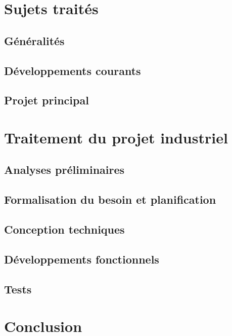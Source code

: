 \documentclass[a4paper, 12pt]{report}
\begin{document}

\chapter{Sujets traités}

\section{Généralités}
\section{Développements courants}
\section{Projet principal}


\chapter{Traitement du projet industriel}

\section{Analyses préliminaires}
\section{Formalisation du besoin et planification}
\section{Conception techniques}
\section{Développements fonctionnels}
\section{Tests}


\chapter*{Conclusion}

\end{document}
